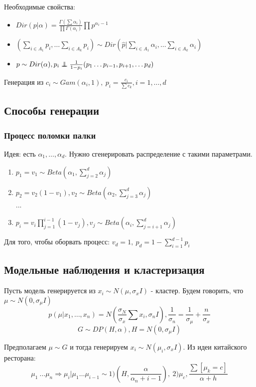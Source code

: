 Необходимые свойства:
\begin{itemize}
	\item $Dir(p|\alpha) = \frac{\Gamma(\sum \alpha_i)}{\prod \Gamma(\alpha_i)}\prod p^{\alpha_i-1}$
	\item $(\sum_{i \in A_1} p_i, \ldots \sum_{i \in A_k} p_i) \sim Dir(\hat{p}|\sum_{i \in A_1} \alpha_i, \ldots \sum_{i \in A_k} \alpha_i)$
	\item $p \sim Dir(\alpha), p_i \indep \frac{1}{1-p_i}(p_1 \ldots p_{i-1}, p_{i+1}, \ldots p_d)$
\end{itemize}

Генерация из $c_i \sim Gam(\alpha_i, 1), \ p_i=\frac{c_i}{\sum c_k}, i=1, \ldots, d$
\subsection{Способы генерации}
\subsubsection{Процесс поломки палки} 
Идея: есть $\alpha_1, \ldots, \alpha_d$. Нужно сгенерировать распределение с такими параметрами.
\begin{enumerate}
	\item $p_1=v_1 \sim Beta(\alpha_1, \sum_{j=2}^d \alpha_j)$
	\item $p_2=v_2(1-v_1), v_2 \sim Beta(\alpha_2, \sum_{j=3}^d \alpha_j)$  \\
	...
	\item $p_i = v_i \prod_{j=1}^{i-1}(1-v_j), v_j \sim Beta(\alpha_i, \sum_{j=i+1}^d \alpha_j)$
\end{enumerate}
Для того, чтобы оборвать процесс: $v_d=1, \ p_d=1-\sum_{i=1}^{d-1}p_i$

\subsection{Модельные наблюдения и кластеризация}
Пусть модель генерируется из $x_i \sim N(\mu, \sigma_x I)$ - кластер. Будем говорить, что $\mu \sim N(0, \sigma_{\mu} I)$
$$ p(\mu|x_1, \ldots, x_n) = N(\frac{\sigma_N}{\sigma_x}\sum x_i, \sigma_n I), \frac{1}{\sigma_n} = \frac{1}{\sigma_{\mu}} + \frac{n}{\sigma_x} $$
$$ G \sim DP(H, \alpha), H = N(0, \sigma_{\mu}I) $$

Предполагаем $\mu \sim G$ и тогда генерируем $x_i \sim N(\mu_i, \sigma_x I)$. Из идеи китайского ресторана:
$$ \mu_1\ \ldots \mu_n \Rightarrow \mu_i|\mu_1 \ldots \mu_{i-1} \sim 1) (H, \frac{\alpha}{\alpha_n+i-1}), \ 2)\mu_c, \frac{\sum [\mu_k=c]}{\alpha+h}  $$

